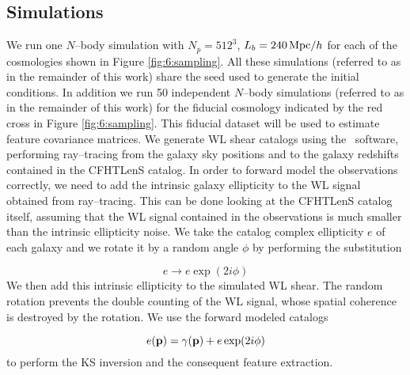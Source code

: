 \subsection{Simulations}
We run one $N$--body simulation with $N_p=512^3$, $L_b=240\,{\rm Mpc}/h$ for each of the cosmologies shown in Figure \ref{fig:6:sampling}. All these simulations (referred to as  in the remainder of this work) share the seed used to generate the initial conditions. In addition we run 50 independent $N$--body simulations (referred to as  in the remainder of this work) for the fiducial cosmology indicated by the red cross in Figure \ref{fig:6:sampling}. This fiducial dataset will be used to estimate feature covariance matrices. We generate WL shear catalogs using the \LT\, software, performing ray--tracing from the galaxy sky positions and to the galaxy redshifts contained in the CFHTLenS catalog. In order to forward model the observations correctly, we need to add the intrinsic galaxy ellipticity to the WL signal obtained from ray--tracing. This can be done looking at the CFHTLenS catalog itself, assuming that the WL signal contained in the observations is much smaller than the intrinsic ellipticity noise. We take the catalog complex ellipticity $e$ of each galaxy and we rotate it by a random angle $\phi$ by performing the substitution

\begin{equation}
\label{eq:6:randrot}
e \rightarrow e\exp(2i\phi)
\end{equation} 
%
We then add this intrinsic ellipticity to the simulated WL shear. The random rotation prevents the double counting of the WL signal, whose spatial coherence is destroyed by the rotation. We use the forward modeled catalogs 

\begin{equation}
\label{eq:6:forwardcatalog}
e(\mathbf{p}) = \gamma(\mathbf{p}) + e\exp(2i\phi)
\end{equation}
%
to perform the KS inversion and the consequent feature extraction.      

